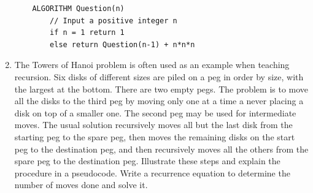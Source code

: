 \documentclass{article}
\begin{document}
\begin{enumerate}
    \begin{lstlisting}
    ALGORITHM Question(n)
        // Input a positive integer n
        if n = 1 return 1
        else return Question(n-1) + n*n*n
    \end{lstlisting}

    \item The Towers of Hanoi problem is often used as an example when teaching recursion. Six disks of different sizes are piled on a peg in order by size, with the largest at the bottom. There are two empty pegs. The problem is to move all the disks to the third peg by moving only one at a time a never placing a disk on top of a smaller one. The second peg may be used for intermediate moves. The usual solution recursively moves all but the last disk from the starting peg to the spare peg, then moves the remaining disks on the start peg to the destination peg, and then recursively moves all the others from the spare peg to the destination peg. Illustrate these steps and explain the procedure in a pseudocode. Write a recurrence equation to determine the number of moves done and solve it.
\end{enumerate}
\end{document}
